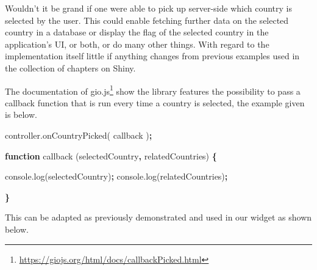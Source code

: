 \documentclass[
]{krantz}
\makeatletter
\newenvironment{Shaded}{\begin{snugshade}}{\end{snugshade}}
\newcommand{\AttributeTok}[1]{\textcolor[rgb]{0.61,0.61,0.61}{#1}}
\newcommand{\KeywordTok}[1]{\textcolor[rgb]{0.27,0.27,0.27}{\textbf{#1}}}
\newcommand{\NormalTok}[1]{#1}
\newcommand{\OperatorTok}[1]{\textcolor[rgb]{0.43,0.43,0.43}{\textbf{#1}}}
\newcommand{\VariableTok}[1]{\textcolor[rgb]{0,0,0}{#1}}
\renewcommand{\href}[2]{#2\footnote{\url{#1}}}
\newenvironment{kframe}{%
\medskip{}
\setlength{\fboxsep}{.8em}
 \def\at@end@of@kframe{}%
 \ifinner\ifhmode%
  \def\at@end@of@kframe{\end{minipage}}%
  \begin{minipage}{\columnwidth}%
 \fi\fi%
 \def\FrameCommand##1{\hskip\@totalleftmargin \hskip-\fboxsep
 \colorbox{shadecolor}{##1}\hskip-\fboxsep
     \hskip-\linewidth \hskip-\@totalleftmargin \hskip\columnwidth}%
 \MakeFramed {\advance\hsize-\width
   \@totalleftmargin\z@ \linewidth\hsize
   \@setminipage}}%
 {\par\unskip\endMakeFramed%
 \at@end@of@kframe}
\renewenvironment{Shaded}{\begin{kframe}}{\end{kframe}}
\makeatother
\begin{document}
Wouldn't it be grand if one were able to pick up server-side which country is selected by the user. This could enable fetching further data on the selected country in a database or display the flag of the selected country in the application's UI, or both, or do many other things. With regard to the implementation itself little if anything changes from previous examples used in the collection of chapters on Shiny.

The \href{https://giojs.org/html/docs/callbackPicked.html}{documentation of gio.js} show the library features the possibility to pass a callback function that is run every time a country is selected, the example given is below.

\begin{Shaded}
\begin{Highlighting}[]
\VariableTok{controller}\NormalTok{.}\AttributeTok{onCountryPicked}\NormalTok{( callback )}\OperatorTok{;}

\KeywordTok{function} \AttributeTok{callback}\NormalTok{ (selectedCountry}\OperatorTok{,}\NormalTok{ relatedCountries) }\OperatorTok{\{}

  \VariableTok{console}\NormalTok{.}\AttributeTok{log}\NormalTok{(selectedCountry)}\OperatorTok{;}
  \VariableTok{console}\NormalTok{.}\AttributeTok{log}\NormalTok{(relatedCountries)}\OperatorTok{;}

\OperatorTok{\}}
\end{Highlighting}
\end{Shaded}

This can be adapted as previously demonstrated and used in our widget as shown below.
\end{document}
